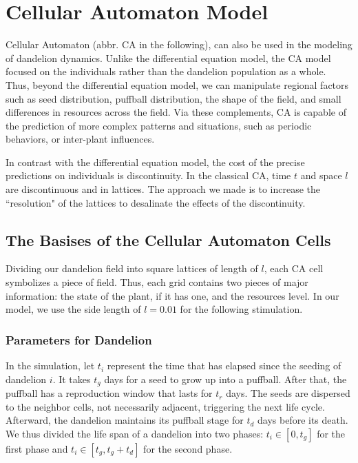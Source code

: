\documentclass[12pt]{article}
\begin{document}
\section{Cellular Automaton Model}
Cellular Automaton (abbr. CA in the following), can also be used in the modeling of dandelion dynamics. Unlike the differential equation model, the CA model focused on the individuals rather than the dandelion population as a whole. Thus, beyond the differential equation model, we can manipulate regional factors such as seed distribution, puffball distribution, the shape of the field, and small differences in resources across the field. Via these complements, CA is capable of the prediction of more complex patterns and situations, such as periodic behaviors, or inter-plant influences.

In contrast with the differential equation model, the cost of the precise predictions on individuals is discontinuity. In the classical CA, time $t$ and space $ l$ are discontinuous and in lattices. The approach we made is to increase the ``resolution" of the lattices to desalinate the effects of the discontinuity.

\subsection{The Basises of the Cellular Automaton Cells}
Dividing our dandelion field into square lattices of length of $ l$, each CA cell symbolizes a piece of field. Thus, each grid contains two pieces of major information: the state of the plant, if it has one, and the resources level. In our model, we use the side length of $ l=0.01$ for the following stimulation.

\subsubsection{Parameters for Dandelion}
In the simulation, let $t_i$ represent the time that has elapsed since the seeding of dandelion $i$. It takes $t_g$ days for a seed to grow up into a puffball. After that, the puffball has a reproduction window that lasts for $t_r$ days. The seeds are dispersed to the neighbor cells, not necessarily adjacent, triggering the next life cycle. Afterward, the dandelion maintains its puffball stage for \(t_d\) days before its death. We thus divided the life span of a dandelion into two phases: $t_i\in \left[0,t_g\right]$ for the first phase and $t_i\in \left[t_g,t_g+t_d\right]$ for the second phase.
\end{document}
